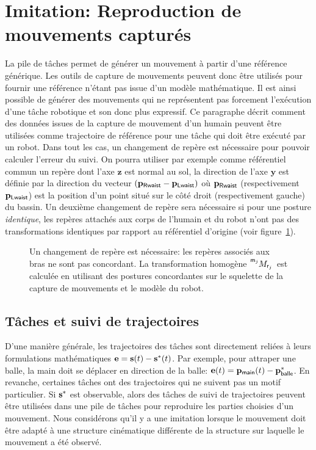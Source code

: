 \section{Imitation: Reproduction de mouvements capturés}
La pile de t\^aches permet de générer un mouvement à partir d'une référence générique.
Les outils de capture de mouvements peuvent donc être utilisés pour fournir 
une référence n'étant pas issue d'un modèle mathématique. Il est ainsi possible de générer
des mouvements qui ne représentent pas forcement l'exécution d'une t\^ache robotique et son donc plus expressif.
Ce paragraphe décrit comment des données issues de la capture de mouvement d'un humain
peuvent être utilisées comme trajectoire de référence pour une t\^ache qui
doit être exécuté par un robot.
Dans tout les cas, un
changement de repère est nécessaire pour pouvoir calculer l'erreur du suivi. On pourra utiliser par
exemple comme référentiel commun un repère dont l'axe 
$\boldsymbol{z}$ est normal au sol, la direction de l'axe $\boldsymbol{y}$
est définie par la direction du vecteur $\left( {\mathbf{p}}_{\textsf{Rwaist}} - {\mathbf{p}}_{\textsf{Lwaist}} \right)$
où ${\mathbf{p}}_{\textsf{Rwaist}}$ (respectivement ${\mathbf{p}}_{\textsf{Lwaist}}$) est 
la position d'un point situé sur le côté droit (respectivement gauche) du bassin.
Un deuxième changement de repère sera nécessaire si pour une posture \emph{identique},
les repères attachés aux corps de l'humain et du robot n'ont pas des transformations identiques par
rapport au référentiel d'origine (voir figure~\ref{fig:changeRepere}).
\begin{figure}[t]
  \begin{center}
    \resizebox{0.95\textwidth}{!}{
    
    }
  \end{center}
  \caption[Changement de repères du squelette de la capture de mouvement vers le robot.]{Un changement de repère est nécessaire: les repères associés aux bras ne sont pas concordant.
  La transformation homogène $\tensor[^{\textsf{m}_j}]{M}{_{\textsf{r}_j}}$ est calculée en utilisant 
  des postures concordantes sur le squelette de la capture de mouvements et le modèle du robot.}
  \label{fig:changeRepere}
\end{figure}

\subsection{T\^aches et suivi de trajectoires}
D'une manière générale, les trajectoires des t\^aches sont directement
reliées à leurs formulations mathématiques ${\mathbf{e}} = {\mathbf{s}}(t) - {\mathbf{s}}^*(t)$.
Par exemple, pour attraper
une balle, la main doit se déplacer en direction de la balle: ${\mathbf{e}}(t) = {\mathbf{p}}_{\textsf{main}}(t) - {\mathbf{p}}_{\textsf{balle}}^*$. 
En revanche, certaines t\^aches ont des trajectoires qui ne suivent pas un motif
particulier.
Si ${\mathbf{s}}^*$ est observable, alors des t\^aches de suivi de trajectoires peuvent être
utilisées dans une pile de t\^aches pour reproduire les parties choisies d'un mouvement.
Nous considérons qu'il y a une imitation lorsque le mouvement doit être adapté 
à une structure cinématique différente de la structure sur laquelle le mouvement a été observé.

